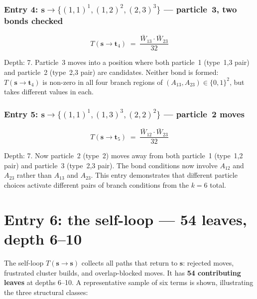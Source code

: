 \documentclass[11pt,a4paper]{article}
\newcommand{\Wb}[1]{\bar{W}_{#1}}
\newcommand{\s}{\mathbf{s}}
\newcommand{\tp}{\mathbf{t}}
\begin{document}
\subsubsection*{Entry 4: $\s\to\{(1,1)^1,(1,2)^2,(2,3)^3\}$
  --- particle~3, two bonds checked}

\[
  T(\s\to\tp_4) \;=\; \frac{\Wb{13}\cdot\Wb{23}}{32}
\]

Depth: 7.  Particle~3 moves into a position where both particle~1 (type~1,3
pair) and particle~2 (type~2,3 pair) are candidates.  Neither bond is formed:
$T(\s\to\tp_4)$ is non-zero in all four branch regions of
$(A_{13},A_{23})\in\{0,1\}^2$, but takes different values in each.

\subsubsection*{Entry 5: $\s\to\{(1,1)^1,(1,3)^3,(2,2)^2\}$
  --- particle~2 moves}

\[
  T(\s\to\tp_5) \;=\; \frac{\Wb{12}\cdot\Wb{23}}{32}
\]

Depth: 7.  Now particle~2 (type~2) moves away from both particle~1 (type~1,2
pair) and particle~3 (type~2,3 pair).  The bond conditions now involve
$A_{12}$ and $A_{23}$ rather than $A_{13}$ and $A_{23}$.  This entry
demonstrates that different particle choices activate different pairs of
branch conditions from the $k=6$ total.

\section{Entry 6: the self-loop --- 54 leaves, depth 6--10}

The self-loop $T(\s\to\s)$ collects all paths that return to $\s$: rejected
moves, frustrated cluster builds, and overlap-blocked moves.  It has
\textbf{54 contributing leaves} at depths 6--10.  A representative sample
of six terms is shown, illustrating the three structural classes:
\end{document}
